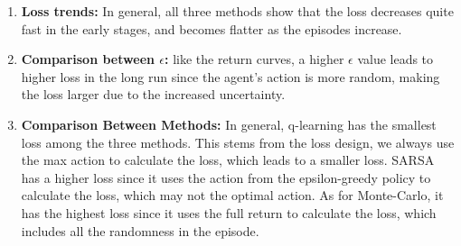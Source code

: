 \documentclass[a4paper]{article}
\begin{document}
\begin{answer}
        \begin{enumerate}
            \item \textbf{Loss trends:} In general, all three methods show that the loss decreases quite fast in the early stages, 
            and becomes flatter as the episodes increase. 
            \item \textbf{Comparison between $\epsilon$:} like the return curves, a higher $\epsilon$ value leads to higher loss in the long run 
            since the agent's action is more random, making the loss larger due to the increased uncertainty.
            \item \textbf{Comparison Between Methods:} In general, q-learning has the smallest loss among the three methods. This stems from the loss design, we always use the max action to calculate the loss, 
            which leads to a smaller loss. SARSA has a higher loss since it uses the action from the epsilon-greedy policy to calculate the loss, which may not the optimal action.
            As for Monte-Carlo, it has the highest loss since it uses the full return to calculate the loss, which includes all the randomness in the episode.
        \end{enumerate}

    \end{answer}
\end{document}
